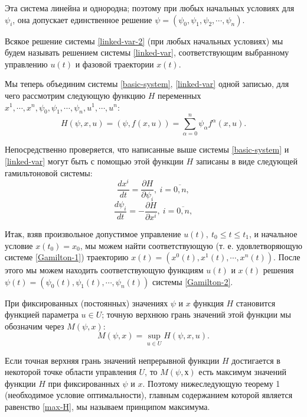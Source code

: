 \documentclass[14pt]{extreport}
\begin{document}
Эта система линейна и однородна; поэтому при любых начальных условиях для $\psi_i$, она допускает единственное решение
$\psi=(\psi_0,\psi_1,\psi_2,\cdots,\psi_n)$.

Вся­кое решение системы \eqref{linked-var-2} (при любых начальных ус­ловиях) мы будем называть решением системы \eqref{linked-var}, соответствующим выбранному управлению $u(t)$ и фазо­вой траектории $x(t)$.

Мы теперь объединим системы \eqref{basic-system}, \eqref{linked-var} одной за­писью, для чего рассмотрим следующую функцию $H$ пе­ременных $x^1,\cdots,x^n,\psi_0,\psi_1,\cdots,\psi_n,u^1,\cdots,u^n$:
\begin{equation}
\label{func-H}
H(\psi,x,u)=(\psi,f(x,u))=\sum\limits_{\alpha=0}^{n} \psi_{\alpha} f^{\alpha} (x,u).
\end{equation}

Непосредственно проверяется, что написанные выше си­стемы \eqref{basic-system} и \eqref{linked-var} могут быть с помощью этой функции $H$ записаны в виде следующей гамильтоновой системы:
\begin{equation}
\label{Gamilton-1}
\dfrac{dx^i}{dt}=\dfrac{\partial H}{\partial \psi_i},\ i=\overline{0,n},
\end{equation}
\begin{equation}
\label{Gamilton-2}
\dfrac{d\psi_i}{dt}=-\dfrac{\partial H}{\partial x^i},\ i=\overline{0,n},
\end{equation}

Итак, взяв произвольное допустимое управление $u(t),\ t_0 \leq t \leq t_1 $, и начальное условие $x(t_0)=x_0$, мы можем найти соответствующую (т. е. удовлетворяющую системе \eqref{Gamilton-1}) траекторию $x(t)=(x^0(t),x^1(t),\cdots,x^n(t))$. После этого мы можем находить соответствующую функциям $u(t)$ и $x(t)$ ре­шения $\psi(t)=(\psi_0(t),\psi_1(t),\cdots,\psi_n(t))$ системы \eqref{Gamilton-2}.

При фиксированных (постоянных) значениях $\psi$ и $x$ функция $H$ становится функцией параметра $u \in U$; точ­ную верхнюю грань значений этой функции мы обозна­чим через $M(\psi,x)$:
\begin{equation}
\label{func-M}
M(\psi,x)=\sup\limits_{u\in U} H(\psi,x,u).
\end{equation}

Если точная верхняя грань значений непрерывной функ­ции $H$ достигается в некоторой точке области управления $U$, то $M(\psi, х)$ есть максимум значений функ­ции $H$ при фиксированных $\psi$ и $x$. Поэтому нижеследую­щую теорему 1 (необходимое условие оптимальности), главным содержанием которой является равенство \eqref{max-H}, мы называем принципом максимума.
\end{document}
